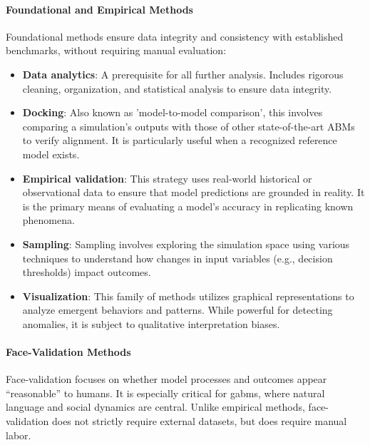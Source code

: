 \paragraph{Foundational and Empirical Methods}
Foundational methods ensure data integrity and consistency with established benchmarks, without requiring manual evaluation:

\begin{itemize}[nosep, noitemsep]
	\item \textbf{Data analytics}: A prerequisite for all further analysis. Includes rigorous cleaning, organization, and statistical analysis to ensure data integrity.
	
	\item \textbf{Docking}: Also known as 'model-to-model comparison', this involves comparing a simulation's outputs with those of other state-of-the-art ABMs to verify alignment. It is particularly useful when a recognized reference model exists.
	
	\item \textbf{Empirical validation}: This strategy uses real-world historical or observational data to ensure that model predictions are grounded in reality. It is the primary means of evaluating a model's accuracy in replicating known phenomena.
	
	\item \textbf{Sampling}: Sampling involves exploring the simulation space using various techniques to understand how changes in input variables (e.g., decision thresholds) impact outcomes.
	
	\item \textbf{Visualization}: This family of methods utilizes graphical representations to analyze emergent behaviors and patterns. While powerful for detecting anomalies, it is subject to qualitative interpretation biases.
\end{itemize}


\paragraph{Face-Validation Methods}
Face-validation focuses on whether model processes and outcomes appear ``reasonable'' to humans. It is especially critical for \acp{gabm}, where natural language and social dynamics are central. Unlike empirical methods, face-validation does not strictly require external datasets, but does require manual  labor.

